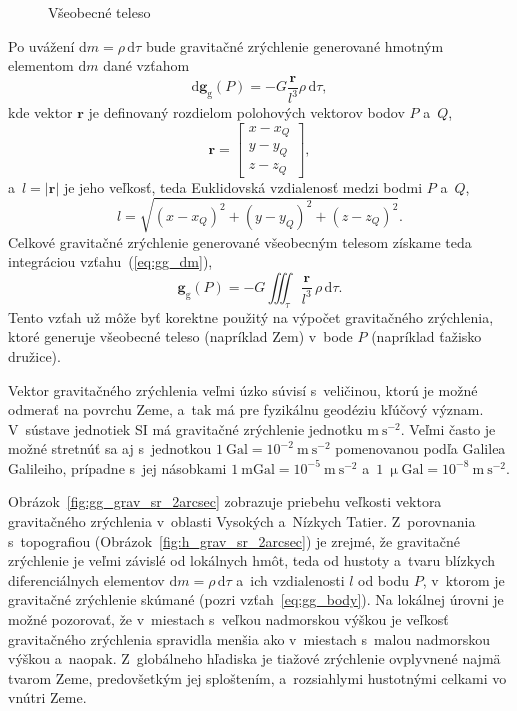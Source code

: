 \documentclass[a4paper, 12pt]{book}
\newcommand{\diff}{\mathrm d}
\newcommand{\gidx}{\mathrm g}
\let\vec\mathbf
\begin{document}
\begin{figure}
\centering

\caption{Všeobecné teleso}
\label{fig:gravitating_body}
\end{figure}

Po uvážení $\diff m = \rho \, \diff \tau$ bude gravitačné zrýchlenie generované 
hmotným elementom $\diff m$ dané vzťahom
%
\begin{equation}
\label{eq:gg_dm}
\diff \vec g_\gidx(P) = -G \frac{\vec r}{l^3} \rho \, \diff\tau{,}
\end{equation}
%
kde vektor $\vec r$ je definovaný rozdielom polohových vektorov bodov $P$ 
a~$Q$,
%
\begin{equation}
\label{eq:r}
\vec r = 
%
\begin{bmatrix}
x - x_Q \\
y - y_Q \\
z - z_Q
\end{bmatrix}
{,}
\end{equation}
%
a~$l = | \vec r |$ je jeho veľkosť, teda Euklidovská vzdialenosť medzi bodmi 
$P$ a~$Q$,
%
\begin{equation}
\label{eq:l}
l = \sqrt{(x - x_Q)^2 + (y - y_Q)^2 + (z - z_Q)^2}{.}
\end{equation}
%
Celkové gravitačné zrýchlenie generované všeobecným telesom získame teda 
integráciou vzťahu~(\ref{eq:gg_dm}),
%
\begin{equation}
\label{eq:gg_body}
\vec g_\gidx(P) = -G \iiint_{\tau} \frac{\vec r}{l^3} \, \rho \, \diff\tau{.}
\end{equation}
%
Tento vzťah už môže byť korektne použitý na výpočet gravitačného zrýchlenia, 
ktoré generuje všeobecné teleso (napríklad Zem) v~bode $P$ (napríklad ťažisko 
družice).

Vektor gravitačného zrýchlenia veľmi úzko súvisí s~veličinou, ktorú je možné 
odmerať na povrchu Zeme, a~tak má pre fyzikálnu geodéziu kľúčový význam.  
V~sústave jednotiek SI má gravitačné zrýchlenie jednotku $\mathrm{m}\ 
\mathrm{s}^{-2}$.  Veľmi často je možné stretnúť sa aj s~jednotkou $1\ 
\mathrm{Gal} = 10^{-2}\ \mathrm{m}\ \mathrm{s}^{-2}$ pomenovanou podľa Galilea 
Galileiho, prípadne s~jej násobkami $1\ \mathrm{mGal} = 10^{-5}\ \mathrm{m}\ 
\mathrm{s}^{-2}$ a~$1\ \upmu \mathrm{Gal} = 10^{-8}\ \mathrm{m}\ 
\mathrm{s}^{-2}$.

Obrázok~\ref{fig:gg_grav_sr_2arcsec} zobrazuje priebehu veľkosti vektora 
gravitačného zrýchlenia v~oblasti Vysokých a~Nízkych Tatier.  Z~porovnania 
s~topografiou (Obrázok~\ref{fig:h_grav_sr_2arcsec}) je zrejmé, že gravitačné 
zrýchlenie je veľmi závislé od lokálnych hmôt, teda od hustoty a~tvaru blízkych 
diferenciálnych elementov $\diff m = \rho \, \diff \tau$ a~ich vzdialenosti $l$ 
od bodu $P$, v~ktorom je gravitačné zrýchlenie skúmané (pozri 
vzťah~\ref{eq:gg_body}).  Na lokálnej úrovni je možné pozorovať, že v~miestach 
s~veľkou nadmorskou výškou je veľkosť gravitačného zrýchlenia spravidla menšia 
ako v~miestach s~malou nadmorskou výškou a~naopak.  Z~globálneho hľadiska je 
tiažové zrýchlenie ovplyvnené najmä tvarom Zeme, predovšetkým jej sploštením, 
a~rozsiahlymi hustotnými celkami vo vnútri Zeme.
\end{document}
